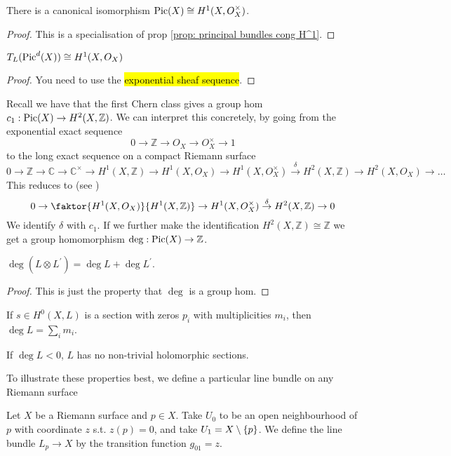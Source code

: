 \documentclass{article}
\begin{document}
\begin{prop}
	There is a canonical isomorphism $\operatorname{Pic}(X) \cong H^1(X, O_X^\times)$. 
\end{prop}
\begin{proof}
	This is a specialisation of prop \ref{prop: principal bundles cong H^1}.
\end{proof}
\begin{corollary}
	$T_L(\operatorname{Pic}^d(X)) \cong H^1(X,O_X)$
\end{corollary}
\begin{proof}
	You need to use the \hl{exponential sheaf sequence}. 
\end{proof}

Recall we have that the first Chern class gives a group hom $c_1 : \operatorname{Pic}(X) \to H^2(X,\mathbb{Z})$. We can interpret this concretely, by going from the exponential exact sequence 
\[
0 \to \mathbb{Z} \to O_X \to O_X^\times \to 1 
\] 
to the long exact sequence on a compact Riemann surface 
\[
0 \to \mathbb{Z} \to \mathbb{C} \to \mathbb{C}^\times \to H^1(X,\mathbb{Z}) \to H^1(X,O_X) \to H^1(X,O_X^\times) \overset{\delta}{\to} H^2(X,\mathbb{Z}) \to H^2(X,O_X) \to \dots 
\]
This reduces to (see \cite{Hitchin2013})
\[
0 \to \faktor{H^1(X,O_X)}{H^1(X,\mathbb{Z})} \to H^1(X,O_X^\times) \overset{\delta}{\to} H^2(X,\mathbb{Z}) \to 0
\]
We identify $\delta$ with $c_1$. If we further make the identification $H^2(X,\mathbb{Z}) \cong \mathbb{Z}$ we get a group homomorphism $\deg:\operatorname{Pic}(X) \to \mathbb{Z}$. 
\begin{lemma}
	$\deg(L \otimes L^\prime) = \deg L + \deg L^\prime$.
\end{lemma}
\begin{proof}
	This is just the property that $\deg$ is a group hom. 
\end{proof}

\begin{prop}
	If $s \in H^0(X,L)$ is a section with zeros $p_i$ with multiplicities $m_i$, then $\deg L = \sum_i m_i$. 
\end{prop}
\begin{corollary}
	If $\deg L < 0$, $L$ has no non-trivial holomorphic sections. 
\end{corollary}
To illustrate these properties best, we define a particular line bundle on any Riemann surface 
\begin{definition}
	Let $X$ be a Riemann surface and $p \in X$. Take $U_0$ to be an open neighbourhood of $p$ with coordinate $z$ s.t. $z(p)=0$, and take $U_1 = X \setminus \left\{ p \right\}$. We define the line bundle $L_p \to X$ by the transition function $g_{01} = z$.  
\end{definition}
\end{document}
